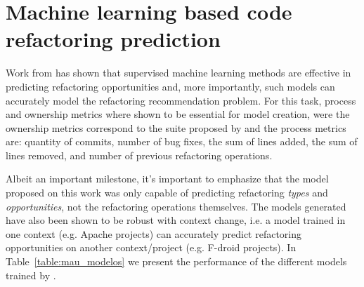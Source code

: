 \section{Machine learning based code refactoring prediction}
\label{sec:mauricio}

Work from \citet{mauricio_paper} has shown that supervised machine learning methods are effective in predicting refactoring opportunities and, more importantly, such models can accurately model the refactoring recommendation problem. 
For this task, process and ownership metrics where shown to be essential for model creation, were the ownership metrics correspond to the suite proposed by \citet{ownership_metrics} and the process metrics are: quantity of commits, number of bug fixes, the sum of lines added, the sum of lines removed,  and number of previous refactoring operations.

Albeit an important milestone, it's important to emphasize that the model proposed on this work was only capable of predicting refactoring \textit{types} and \textit{opportunities}, not the refactoring operations themselves.
The models generated have also been shown to be robust with context change, i.e. a model trained in one context (e.g. Apache projects) can accurately predict refactoring opportunities on another context/project (e.g. F-droid projects). In Table~\ref{table:mau_modelos} we present the performance of the different models trained by \citet{mauricio_paper}.




